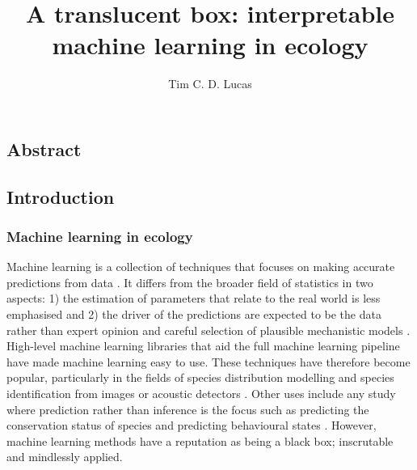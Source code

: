\documentclass[10pt,]{article}
\title{A translucent box: interpretable machine learning in ecology}
\author{Tim C. D. Lucas}
\date{}
\begin{document}
\maketitle

\subsection{Abstract}\label{abstract}

\subsection{Introduction}\label{introduction}

\subsubsection{Machine learning in ecology}\label{machine-learning-in-ecology}

Machine learning is a collection of techniques that focuses on making accurate predictions from data \citep{crisci2012review, breiman2001statistical}. It differs from the broader field of statistics in two aspects: 1) the estimation of parameters that relate to the real world is less emphasised and 2) the driver of the predictions are expected to be the data rather than expert opinion and careful selection of plausible mechanistic models \citep{breiman2001statistical}. High-level machine learning libraries that aid the full machine learning pipeline \citep{caret, scikit, maxent, biomod} have made machine learning easy to use. These techniques have therefore become popular, particularly in the fields of species distribution modelling \citep{maxent, biomod, elith2006novel, golding2018zoon, gobeyn2019evolutionary} and species identification from images or acoustic detectors \citep{mac2018bat, waldchen2018machine, shamir2014classification, xue2017automatic}. Other uses include any study where prediction rather than inference is the focus such as predicting the conservation status of species \citep{bland2015predicting} and predicting behavioural states \citep{browning2018predicting}. However, machine learning methods have a reputation as being a black box; inscrutable and mindlessly applied.
\end{document}
